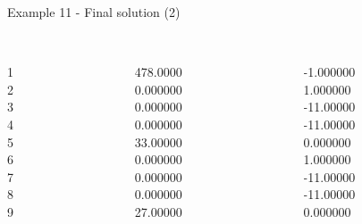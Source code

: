 \begin{frame}{Example 11 - Final solution (2)}
\footnotesize
\begin{columns}[t]
\begin{column}{0.3\textwidth}
\\
1\\
2\\
3\\
4\\
5\\
6\\
7\\
8\\
9\\

\end{column}
\begin{column}{0.3\textwidth}
\\
478.0000\\
0.000000\\
0.000000\\
0.000000\\
33.00000\\
0.000000\\
0.000000\\
0.000000\\
27.00000\\
\end{column}

\begin{column}{0.3\textwidth}
\\
-1.000000\\
1.000000\\
-11.00000\\
-11.00000\\
0.000000\\
1.000000\\
-11.00000\\
-11.00000\\
0.000000\\
\end{column}
\end{columns}
\end{frame}

